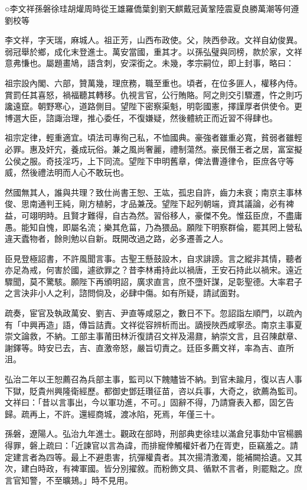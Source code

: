 
\begin{pinyinscope}
○李文祥孫磐徐珪胡爟周時從王雄羅僑葉釗劉天麒戴冠黃鞏陸震夏良勝萬潮等何遵劉校等

李文祥，字天瑞，麻城人。祖正芳，山西布政使。父，陜西參政。文祥自幼俊異。弱冠舉於鄉，成化末登進士。萬安當國，重其才。以孫弘璧與同榜，款於家，文祥意弗慊也。屬題畫鳩，語含刺，安深銜之。未幾，孝宗嗣位，即上封事，略曰：

祖宗設內閣、六部，贊萬幾，理庶務，職至重也。頃者，在位多匪人，權移內侍。賞罰任其喜怒，禍福聽其轉移。仇視言官，公行賄賂。阿之則交引驟遷，忤之則巧讒遠竄。朝野寒心，道路側目。望陛下密察渠魁，明彰國憲，擇謹厚者供使令。更博選大臣，諮諏治理，推心委任，不復嫌疑，然後體統正而近習不得肆也。

祖宗定律，輕重適宜。頃法司專徇己私，不恤國典。豪強者雖重必寬，貧弱者雖輕必罪。惠及奸宄，養成玩俗。兼之風尚奢麗，禮制蕩然。豪民僭王者之居，富室擬公侯之服。奇技淫巧，上下同流。望陛下申明舊章，俾法曹遵律令，臣庶各守等威，然後禮法明而人心不敢玩也。

然國無其人，誰與共理？致仕尚書王恕、王竑，孤忠自許，齒力未衰；南京主事林俊、思南通判王純，剛方植躬，才品兼茂。望陛下起列朝端，資其議論，必有裨益，可翊明時。且賢才難得，自古為然。習俗移人，豪傑不免。惟茲臣庶，不盡庸愚。能知自愧，即屬名流；樂其危菑，乃為猥品。願陛下明察群倫，罷其罔上營私違天蠹物者，餘則勉以自新。既開改過之路，必多遷善之人。

臣見登極詔書，不許風聞言事。古聖王懸鼓設木，自求誹謗。言之縱非其情，聽者亦足為戒，何害於國，遽欲罪之？昔李林甫持此以禍唐，王安石持此以禍宋。遠近驟聞，莫不驚駭。願陛下再頒明詔，廣求直言，庶不墮奸謀，足彰聖德。大率君子之言決非小人之利，諮問倘及，必肆中傷。如有所疑，請試面對。

疏奏，宦官及執政萬安、劉吉、尹直等咸惡之，數日不下。忽詔詣左順門，以疏內有「中興再造」語，傳旨詰責。文祥從容辨析而出。謫授陜西咸寧丞。南京主事夏崇文論救，不納。工部主事莆田林沂復請召文祥及湯鼐，納崇文言，且召陳獻章、謝鐸等。時安已去，吉、直激帝怒，嚴旨切責之。廷臣多薦文祥，率為吉、直所沮。

弘治二年以王恕薦召為兵部主事，監司以下餽贐皆不納。到官未踰月，復以吉人事下獄，貶貴州興隆衛經歷。都御史鄧廷瓚征苗，咨以兵事，大奇之，欲薦為監司。文祥曰：「昔以言事出，今以軍功進，不可。」固辭不得，乃請齎表入都，固乞告歸。疏再上，不許。還經商城，渡冰陷，死焉，年僅三十。

孫磐，遼陽人。弘治九年進士。觀政在部時，刑部典吏徐珪以滿倉兒事劾中官楊鵬得罪，磐上疏曰：「近諫官以言為諱，而排寵倖觸權奸者乃在胥吏，臣竊羞之。請定建言者為四等。最上不避患害，抗彈權貴者。其次揚清激濁，能補闕拾遺。又其次，建白時政，有裨軍國。皆分別擢敘。而粉飾文具、循默不言者，則罷黜之。庶言官知警，不至曠鳷。」時不見用。


\end{pinyinscope}
